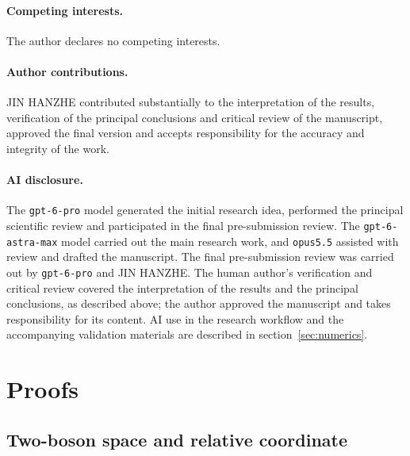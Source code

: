 \documentclass[12pt,a4paper]{article}
\theoremstyle{remark}
\begin{document}
\paragraph{Competing interests.}
The author declares no competing interests.

\paragraph{Author contributions.}
JIN HANZHE contributed substantially to the interpretation of the results, verification of the principal conclusions and critical review of the manuscript, approved the final version and accepts responsibility for the accuracy and integrity of the work.

\paragraph{AI disclosure.}
The \texttt{gpt-6-pro} model generated the initial research idea, performed the principal scientific review and participated in the final pre-submission review. The \texttt{gpt-6-astra-max} model carried out the main research work, and \texttt{opus5.5} assisted with review and drafted the manuscript. The final pre-submission review was carried out by \texttt{gpt-6-pro} and JIN HANZHE. The human author's verification and critical review covered the interpretation of the results and the principal conclusions, as described above; the author approved the manuscript and takes responsibility for its content. AI use in the research workflow and the accompanying validation materials are described in section~\ref{sec:numerics}.

\appendix

\section{Proofs}\label{app:proofs}

\subsection{Two-boson space and relative coordinate}\label{app:P1}
\end{document}
